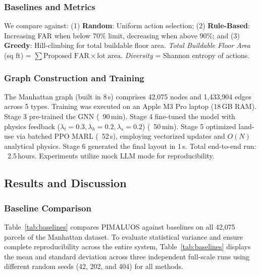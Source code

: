 \documentclass[final,3p,times]{elsarticle}
\begin{document}
\subsubsection{Baselines and Metrics}
We compare against: (1) \textbf{Random}: Uniform action selection; (2) \textbf{Rule-Based}: Increasing FAR when below 70\% limit, decreasing when above 90\%; and (3) \textbf{Greedy}: Hill-climbing for total buildable floor area. \textit{Total Buildable Floor Area} (sq ft) = $\sum \text{Proposed FAR} \times \text{lot area}$. \textit{Diversity} = Shannon entropy of actions.

\subsubsection{Graph Construction and Training}
The Manhattan graph (built in 8\,s) comprises 42,075 nodes and 1,433,904 edges across 5 types. Training was executed on an Apple M3 Pro laptop (18\,GB RAM). Stage 3 pre-trained the GNN (~90\,min). Stage 4 fine-tuned the model with physics feedback ($\lambda_t=0.3, \lambda_h=0.2, \lambda_s=0.2$) (~50\,min). Stage 5 optimized land-use via batched PPO MARL (~52\,s), employing vectorized updates and $O(N)$ analytical physics. Stage 6 generated the final layout in 1\,s. Total end-to-end run: ~2.5\,hours. Experiments utilize mock LLM mode for reproducibility.

\subsection{Results and Discussion}

\subsubsection{Baseline Comparison}
Table~\ref{tab:baselines} compares PIMALUOS against baselines on all 42,075 parcels of the Manhattan dataset. To evaluate statistical variance and ensure complete reproducibility across the entire system, Table~\ref{tab:baselines} displays the mean and standard deviation across three independent full-scale runs using different random seeds (42, 202, and 404) for all methods.
\end{document}
